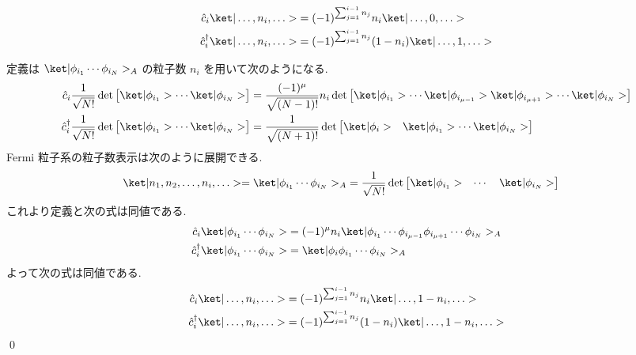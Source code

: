 \documentclass[uplatex,dvipdfmx,a4paper,11pt]{jlreq}
\makeatletter
\numberwithin{equation}{section}
\theoremstyle{definition}
\renewenvironment{proof}[1][\proofname]{\par
  \normalfont
  \topsep6\p@\@plus6\p@ \trivlist
  \item[\hskip\labelsep{\bfseries #1}\@addpunct{\bfseries}]\ignorespaces\quad\par
}{%
  \qed\endtrivlist\@endpefalse
}
\renewcommand\proofname{証明}
\makeatother
\begin{document}
\begin{theorem}[Q21-50, Q21-51]
  \begin{align}
    \hat{c}_i\ket|\ldots,n_i,\ldots>         & = (-1)^{\sum_{j=1}^{i-1}n_j}n_i\ket|\ldots,0,\ldots>       \\
    \hat{c}_i^\dagger\ket|\ldots,n_i,\ldots> & = (-1)^{\sum_{j=1}^{i-1}n_j}(1 - n_i)\ket|\ldots,1,\ldots>
  \end{align}
\end{theorem}
\begin{proof}
  定義は $\ket|\phi_{i_1}\cdots\phi_{i_N}>_A$ の粒子数 $n_i$ を用いて次のようになる.
  \begin{align}
    \hat{c}_i\frac{1}{\sqrt{N!}}\det\begin{bmatrix}\ket|\phi_{i_1}> \cdots \ket|\phi_{i_N}>\end{bmatrix}         & = \frac{(-1)^\mu}{\sqrt{(N-1)!}}n_i\det\begin{bmatrix}\ket|\phi_{i_1}> \cdots \ket|\phi_{i_{\mu-1}}>\ket|\phi_{i_{\mu+1}}>\cdots\ket|\phi_{i_N}>\end{bmatrix} \\
    \hat{c}_i^\dagger\frac{1}{\sqrt{N!}}\det\begin{bmatrix}\ket|\phi_{i_1}> \cdots \ket|\phi_{i_N}>\end{bmatrix} & = \frac{1}{\sqrt{(N+1)!}}\det\begin{bmatrix}\ket|\phi_i> & \ket|\phi_{i_1}> \cdots \ket|\phi_{i_N}>\end{bmatrix}
  \end{align}
  Fermi 粒子系の粒子数表示は次のように展開できる.
  \begin{align}
    \ket|n_1,n_2,\ldots,n_i,\ldots> = \ket|\phi_{i_1}\cdots\phi_{i_N}>_A & = \frac{1}{\sqrt{N!}}\det\begin{bmatrix}\ket|\phi_{i_1}> & \cdots & \ket|\phi_{i_N}>\end{bmatrix}
  \end{align}
  これより定義と次の式は同値である.
  \begin{align}
    \hat{c}_i\ket|\phi_{i_1}\cdots\phi_{i_N}>         & = (-1)^\mu n_i\ket|\phi_{i_1}\cdots\phi_{i_{\mu-1}}\phi_{i_{\mu+1}}\cdots\phi_{i_N}>_A \\
    \hat{c}_i^\dagger\ket|\phi_{i_1}\cdots\phi_{i_N}> & = \ket|\phi_i\phi_{i_1}\cdots\phi_{i_N}>_A
  \end{align}
  よって次の式は同値である.
  \begin{align}
    \hat{c}_i\ket|\ldots,n_i,\ldots>         & = (-1)^{\sum_{j=1}^{i-1}n_j} n_i\ket|\ldots,1-n_i,\ldots>    \\
    \hat{c}_i^\dagger\ket|\ldots,n_i,\ldots> & = (-1)^{\sum_{j=1}^{i-1}n_j}(1-n_i)\ket|\ldots,1-n_i,\ldots>
  \end{align}
\end{proof}
\end{document}
